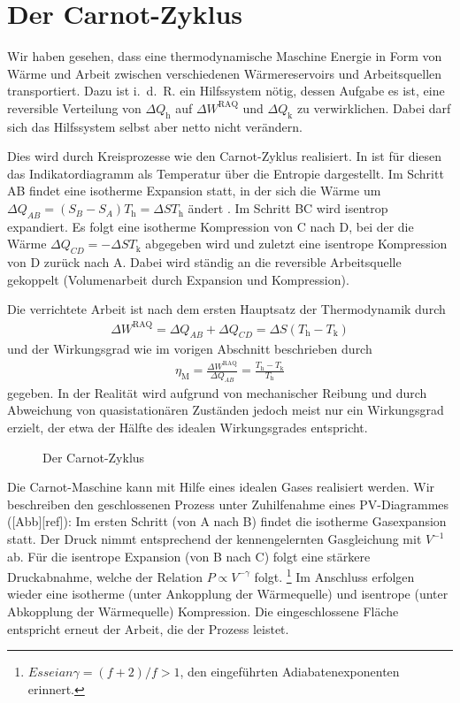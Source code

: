 \section{Der Carnot-Zyklus}

Wir haben gesehen, dass eine thermodynamische Maschine Energie in Form von Wärme und Arbeit zwischen verschiedenen Wärmereservoirs und Arbeitsquellen transportiert. Dazu ist i.~d.~R. ein Hilfssystem nötig, dessen Aufgabe es ist, eine reversible Verteilung von $\Delta Q_\mathrm{h}$ auf $\Delta W^\mathrm{RAQ}$ und $\Delta Q_\mathrm{k}$ zu verwirklichen. Dabei darf sich das Hilfssystem selbst aber netto nicht verändern. 


Dies wird durch Kreisprozesse wie den Carnot-Zyklus realisiert. In  ist für diesen das Indikatordiagramm als Temperatur über die Entropie dargestellt. Im Schritt AB findet eine isotherme Expansion statt, in der sich die Wärme um $\Delta Q_{AB}=(S_B-S_A)T_\mathrm{h} = \Delta S T_\mathrm{h}$ ändert . Im Schritt BC wird isentrop expandiert. Es folgt eine isotherme Kompression von C nach D, bei der die Wärme $\Delta Q_{CD}=-\Delta S T_\mathrm{k}$ abgegeben wird und zuletzt eine isentrope Kompression von D zurück nach A. Dabei wird ständig an die reversible Arbeitsquelle gekoppelt (Volumenarbeit durch Expansion und Kompression). 

Die verrichtete Arbeit ist nach dem ersten Hauptsatz der Thermodynamik durch 
\begin{align*}
    \Delta W^\mathrm{RAQ}=\Delta Q_{AB}+\Delta Q_{CD} = \Delta S(T_\mathrm{h}-T_\mathrm{k})
\end{align*}
und der Wirkungsgrad wie im vorigen Abschnitt beschrieben durch 
\begin{align}
    \eta_\mathrm{M} = \frac{\Delta W^\mathrm{RAQ}}{\Delta Q_{AB}} = \frac{T_\mathrm{h}-T_\mathrm{k}}{T_\mathrm{h}}
\end{align}
gegeben. In der Realität wird aufgrund von mechanischer Reibung und durch Abweichung von quasistationären Zuständen jedoch meist nur ein Wirkungsgrad erzielt, der etwa der Hälfte des idealen Wirkungsgrades entspricht. 

\begin{figure}[htbp]
    \centering
    \tfigCarnotCycleIndicatorDiagram
    \caption{Der Carnot-Zyklus}
    \label{fig:CarnotCycleIndicatorDiagram}
\end{figure}

Die Carnot-Maschine kann mit Hilfe eines idealen Gases realisiert werden.
Wir beschreiben den geschlossenen Prozess unter Zuhilfenahme eines PV-Diagrammes ([Abb][ref]):
Im ersten Schritt (von A nach B) findet die isotherme Gasexpansion statt. Der Druck nimmt entsprechend der kennengelernten Gasgleichung mit $V^{-1}$ ab. Für die isentrope Expansion (von B nach C) folgt eine stärkere Druckabnahme, welche der Relation $P \propto V^{-\gamma}$ folgt. \footnote{$Es sei an \gamma=(f+2)/f>1$, den eingeführten Adiabatenexponenten erinnert.} Im Anschluss erfolgen wieder eine isotherme (unter Ankopplung der Wärmequelle) und isentrope (unter Abkopplung der Wärmequelle) Kompression. Die eingeschlossene Fläche entspricht erneut der Arbeit, die der Prozess leistet. 

